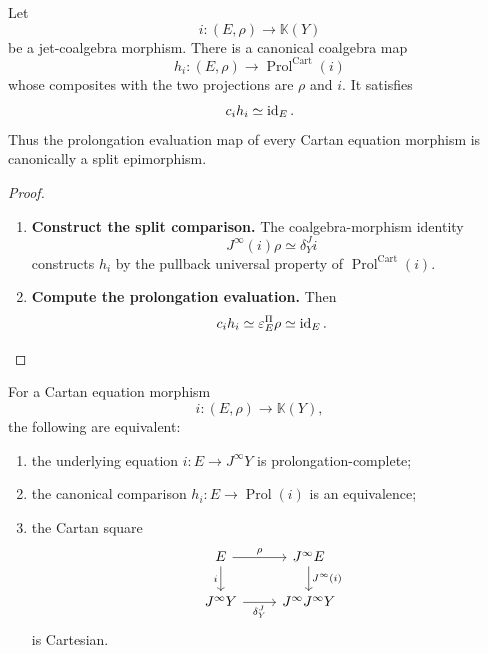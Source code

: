 \begin{proposition}
\label{prop:split-formal-solution-value-map}
Let
\[
  i:(E,\rho)\to\mathbb K(Y)
\]
be a jet-coalgebra morphism. There is a canonical coalgebra map
\[
  h_i:(E,\rho)\to \operatorname{Prol}^{\mathrm{Cart}}(i)
\]
whose composites with the two projections are \(\rho\) and \(i\). It satisfies
\[
  c_ih_i\simeq\operatorname{id}_E.
\]
Thus the prolongation evaluation map of every Cartan equation morphism is canonically a split
epimorphism.
\end{proposition}

\begin{proof}
\leavevmode
\begin{enumerate}[label=\textup{(\arabic*)}]
    \item \textbf{Construct the split comparison.}
The coalgebra-morphism identity
\[
  J^\infty(i)\rho\simeq\delta^J_Yi
\]
constructs \(h_i\) by the pullback universal property of \(\operatorname{Prol}^{\mathrm{Cart}}(i)\).

    \item \textbf{Compute the prolongation evaluation.}
Then
\[
  c_ih_i
  \simeq
  \varepsilon^\Pi_E\rho
  \simeq
  \operatorname{id}_E.
\]
\end{enumerate}
\end{proof}

\begin{theorem}
\label{thm:prolongation-cartesian}
For a Cartan equation morphism
\[
  i:(E,\rho)\to\mathbb K(Y),
\]
the following are equivalent:
\begin{enumerate}
\item the underlying equation \(i:E\to J^\infty Y\) is prolongation-complete;
\item the canonical comparison \(h_i:E\to \operatorname{Prol}(i)\) is an equivalence;
\item the Cartan square
\[
\begin{tikzcd}
E \ar[r,"\rho"] \ar[d,"i"']
  & J^\infty E \ar[d,"J^\infty(i)"]\\
J^\infty Y \ar[r,"\delta^J_Y"']
  & J^\infty J^\infty Y
\end{tikzcd}
\]
is Cartesian.
\end{enumerate}
\end{theorem}

